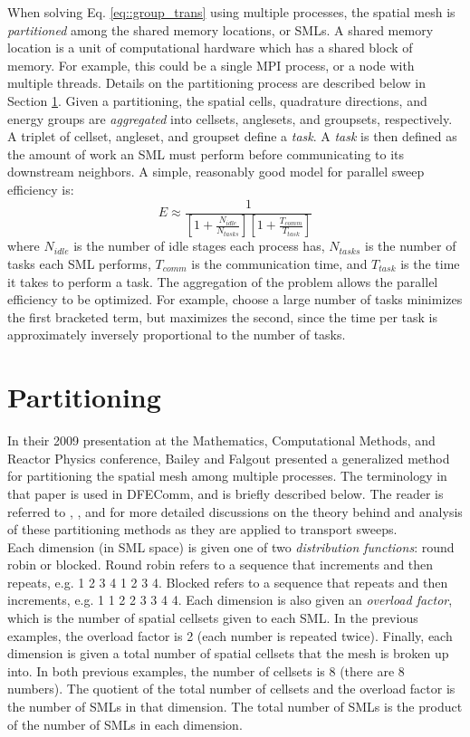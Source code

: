 \documentclass{article}
\begin{document}
When solving Eq. \ref{eq::group_trans} using multiple processes, the spatial mesh is \emph{partitioned} among the shared memory locations, or SMLs. A shared memory location is a unit of computational hardware which has a shared block of memory. For example, this could be a single MPI process, or a node with multiple threads. Details on the partitioning process are described below in Section \ref{sec::Partition}. Given a partitioning, the spatial cells, quadrature directions, and energy groups are \emph{aggregated} into cellsets, anglesets, and groupsets, respectively. A triplet of cellset, angleset, and groupset define a \emph{task}. A \emph{task} is then defined as the amount of work an SML must perform before communicating to its downstream neighbors. A simple, reasonably good model for parallel sweep efficiency is: 
\begin{equation} 
  		E \approx \frac{1}{\left[ 1 + \frac{N_{idle}}{N_{tasks}} \right] \left[ 1 + \frac{T_{comm}}{T_{task}} \right] } 
\end{equation}
where $N_{idle}$ is the number of idle stages each process has, $N_{tasks}$ is the number of tasks each SML performs, $T_{comm}$ is the communication time, and $T_{task}$ is the time it takes to perform a task. The aggregation of the problem allows the parallel efficiency to be optimized. For example, choose a large number of tasks minimizes the first bracketed term, but maximizes the second, since the time per task is approximately inversely proportional to the number of tasks.


\section{Partitioning} \label{sec::Partition}
 In their 2009 presentation at the Mathematics, Computational Methods, and Reactor Physics conference, Bailey and Falgout presented a generalized method for partitioning the spatial mesh among multiple processes. The terminology in that paper is used in DFEComm, and is briefly described below. The reader is referred to \cite{BaileyFalgout}, \cite{sweep-trans}, and \cite{opt-sweep} for more detailed discussions on the theory behind and analysis of these partitioning methods as they are applied to transport sweeps. \\

Each dimension (in SML space) is given one of two \emph{distribution functions}: round robin or blocked. Round robin refers to a sequence that increments and then repeats, e.g. 1 2 3 4 1 2 3 4. Blocked refers to a sequence that repeats and then increments, e.g. 1 1 2 2 3 3 4 4. Each dimension is also given an \emph{overload factor}, which is the number of spatial cellsets given to each SML. In the previous examples, the overload factor is 2 (each number is repeated twice). Finally, each dimension is given a total number of spatial cellsets that the mesh is broken up into. In both previous examples, the number of cellsets is 8 (there are 8 numbers). The quotient of the total number of cellsets and the overload factor is the number of SMLs in that dimension. The total number of SMLs is the product of the number of SMLs in each dimension. \\
 
\end{document}
